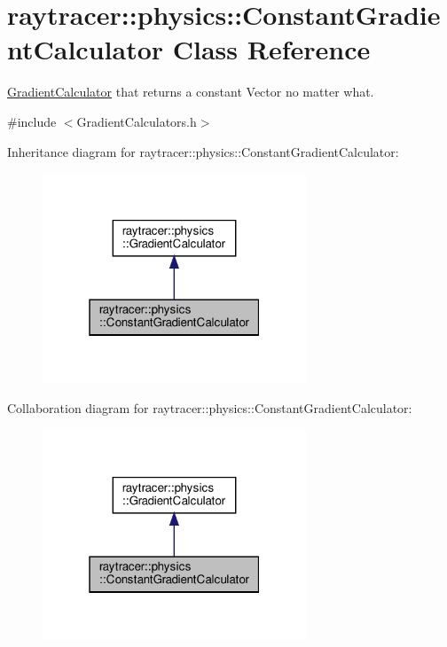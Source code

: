 \hypertarget{classraytracer_1_1physics_1_1ConstantGradientCalculator}{}\section{raytracer\+:\+:physics\+:\+:Constant\+Gradient\+Calculator Class Reference}
\label{classraytracer_1_1physics_1_1ConstantGradientCalculator}


\hyperlink{classraytracer_1_1physics_1_1GradientCalculator}{Gradient\+Calculator} that returns a constant Vector no matter what.  




{\ttfamily \#include $<$Gradient\+Calculators.\+h$>$}



Inheritance diagram for raytracer\+:\+:physics\+:\+:Constant\+Gradient\+Calculator\+:\nopagebreak
\begin{figure}[H]
\begin{center}
\leavevmode
\includegraphics[width=223pt]{classraytracer_1_1physics_1_1ConstantGradientCalculator__inherit__graph}
\end{center}
\end{figure}


Collaboration diagram for raytracer\+:\+:physics\+:\+:Constant\+Gradient\+Calculator\+:\nopagebreak
\begin{figure}[H]
\begin{center}
\leavevmode
\includegraphics[width=223pt]{classraytracer_1_1physics_1_1ConstantGradientCalculator__coll__graph}
\end{center}
\end{figure}
